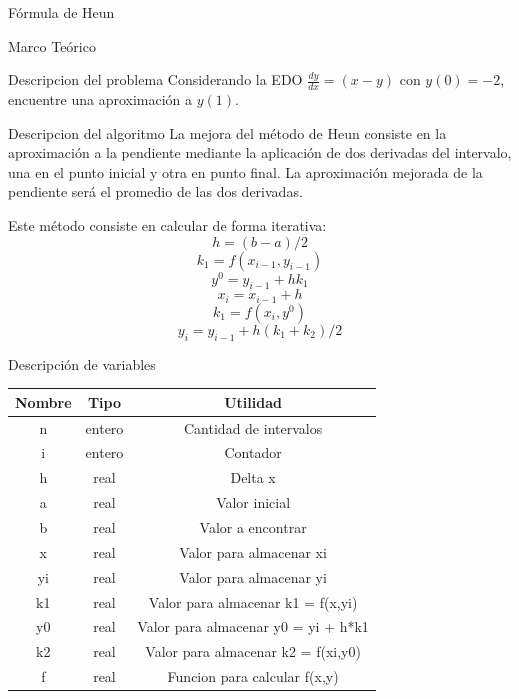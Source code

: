 \documentclass[letterpaper, 12pt]{article}
\begin{document}
  \begin{section}{Fórmula de Heun}
    \begin{subsection}{Marco Teórico}
      \begin{subsubsection}{Descripcion del problema}
        Considerando la EDO $\frac{dy}{dx} = (x -y)$ con $y(0)=-2$, encuentre una aproximación a $y(1)$.
      \end{subsubsection}
      \begin{subsubsection}{Descripcion del algoritmo}
        La mejora del método de Heun consiste en la aproximación a la pendiente mediante la aplicación de dos derivadas del intervalo, una en el punto inicial y otra en punto final. La aproximación mejorada de la pendiente será el promedio de las dos derivadas.

        Este método consiste en calcular de forma iterativa:
        \[h = (b - a)/2\]
        \[k_1 = f(x_{i-1}, y_{i-1})\]
        \[y^0 = y_{i-1} + hk_1\]
        \[x_i = x_{i-1} + h\]
        \[k_1 = f(x_i, y^0)\]
        \[y_i = y_{i-1} + h(k_1 + k_2)/2\]
      \end{subsubsection}
    \end{subsection}
    \begin{subsection}{Descripción de variables}
      \begin{table}[h]
        \centering
        \begin{tabular}{|c c c|}
          \hline
          Nombre & Tipo & Utilidad\\
          \hline\hline
          n & entero & Cantidad de intervalos \\
          i & entero & Contador \\
          h & real & Delta x \\
          a & real & Valor inicial \\
          b & real & Valor a encontrar \\
          x & real & Valor para almacenar xi \\
          yi & real & Valor para almacenar yi\\
          k1 & real & Valor para almacenar k1 = f(x,yi)\\
          y0 & real & Valor para almacenar y0 = yi + h*k1\\
          k2 & real & Valor para almacenar k2 = f(xi,y0)\\
          f & real & Funcion para calcular f(x,y) \\
          \hline
        \end{tabular}

\end{table}
\end{subsection}
\end{section}
\end{document}
